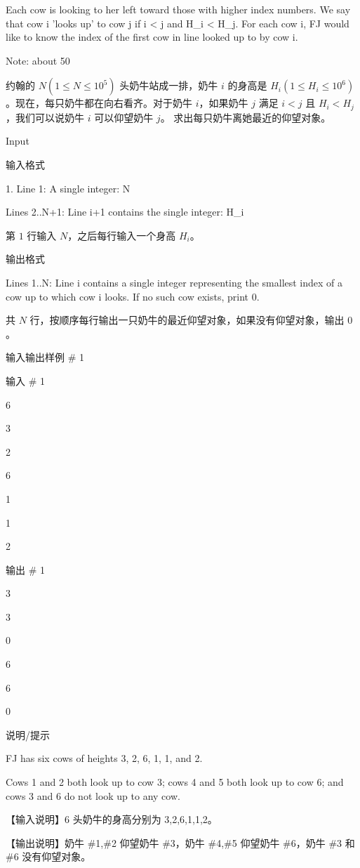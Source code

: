 \documentclass[../main]{subfiles}
\begin{document}
Each cow is looking to her left toward those with higher index numbers. We say that cow i 'looks up' to cow j if i < j and H\_i < H\_j. For each cow i, FJ would like to know the index of the first cow in line looked up to by cow i.

Note: about 50%

约翰的 $N(1\le N\le10^5)$ 头奶牛站成一排，奶牛 $i$ 的身高是 $H_i(1\le H_i\le10^6)$。现在，每只奶牛都在向右看齐。对于奶牛 $i$，如果奶牛 $j$ 满足 $i<j$ 且 $H_i<H_j$，我们可以说奶牛 $i$ 可以仰望奶牛 $j$。 求出每只奶牛离她最近的仰望对象。

Input

输入格式

1. \* Line 1: A single integer: N

\* Lines 2..N+1: Line i+1 contains the single integer: H\_i

第 $1$ 行输入 $N$，之后每行输入一个身高 $H_i$。

输出格式

\* Lines 1..N: Line i contains a single integer representing the smallest index of a cow up to which cow i looks. If no such cow exists, print 0.

共 $N$ 行，按顺序每行输出一只奶牛的最近仰望对象，如果没有仰望对象，输出 $0$。

输入输出样例 \# 1

输入 \# 1

6 

3 

2 

6 

1 

1 

2

输出 \# 1

3 

3 

0 

6 

6 

0

说明/提示

FJ has six cows of heights 3, 2, 6, 1, 1, and 2.


Cows 1 and 2 both look up to cow 3; cows 4 and 5 both look up to cow 6; and cows 3 and 6 do not look up to any cow.

【输入说明】$6$ 头奶牛的身高分别为 3,2,6,1,1,2。

【输出说明】奶牛 \#1,\#2 仰望奶牛 \#3，奶牛 \#4,\#5 仰望奶牛 \#6，奶牛 \#3 和 \#6 没有仰望对象。
\end{document}
